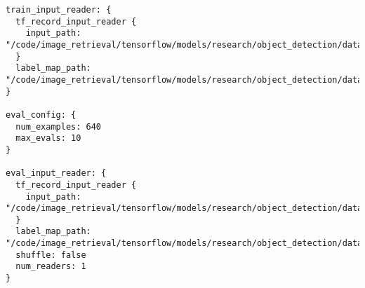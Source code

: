 \begin{lstlisting}[frame=none]
train_input_reader: {
  tf_record_input_reader {
    input_path: "/code/image_retrieval/tensorflow/models/research/object_detection/data/train.record"
  }
  label_map_path: "/code/image_retrieval/tensorflow/models/research/object_detection/data/cust_label_map.pbtxt"
}

eval_config: {
  num_examples: 640
  max_evals: 10
}

eval_input_reader: {
  tf_record_input_reader {
    input_path: "/code/image_retrieval/tensorflow/models/research/object_detection/data/test.record"
  }
  label_map_path: "/code/image_retrieval/tensorflow/models/research/object_detection/data/cust_label_map.pbtxt"
  shuffle: false
  num_readers: 1
}
\end{lstlisting}

